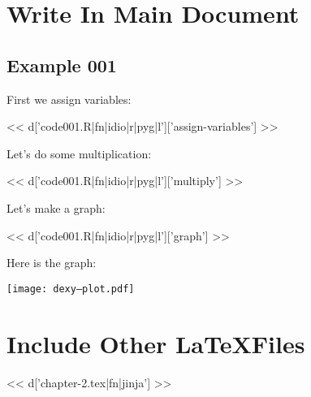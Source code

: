 \chapter{Write In Main Document}

\section{Example 001}
First we assign variables:

<< d['code001.R|fn|idio|r|pyg|l']['assign-variables'] >>

Let's do some multiplication:

<< d['code001.R|fn|idio|r|pyg|l']['multiply'] >>

Let's make a graph:

<< d['code001.R|fn|idio|r|pyg|l']['graph'] >>

Here is the graph:

\texttt{[image: dexy--plot.pdf]}

\chapter{Include Other \LaTeX Files}

<< d['chapter-2.tex|fn|jinja'] >>

